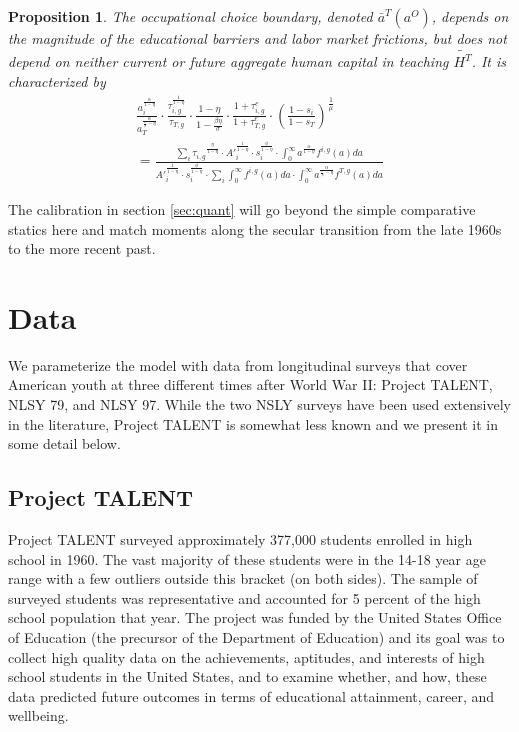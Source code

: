 \documentclass[onehalfspacing,11pt]{article}
\newtheorem{prp}{Proposition}
\begin{document}
\begin{prp} The occupational choice boundary, denoted $\bar{a}^T(a^O)$, depends on the magnitude of the educational barriers and labor market frictions, but does not depend on neither current or future aggregate human capital in teaching $\widetilde{H^T}$. It is characterized by
\begin{align}
\label{eq:occChoice}
\frac{a_i^{\frac{\alpha}{1-\eta}}}{a_T^{\frac{\alpha}{\frac{\sigma}{\beta}-\eta}}} \cdot \frac{\tau_{i,g}^\frac{1}{1-\eta}}{\tau_{T,g}} \cdot \frac{1-\eta}{1-\tfrac{\beta \eta}{\sigma}} \cdot \frac{1+\tau^e_{i,g}}{1+\tau^e_{T,g}} \cdot \left(\frac{1-s_i}{1-s_T}\right)^\frac{1}{\mu} \nonumber\\
= \frac{\sum_i {\tau_{i,g}}^{\frac{\eta}{1-\eta}} \cdot {A'}_i^{\frac{1}{1-\eta}} \cdot s_i^{\frac{\phi}{1-\eta}} \cdot \int_0^\infty a^{\frac{\alpha}{1-\eta}} f^{i,g}(a)da }{{A'}_i^\frac{1}{1-\eta} \cdot s_i^\frac{\phi}{1-\eta} \cdot \sum_i \int_0^\infty f^{i,g}(a)da \cdot \int_0^\infty a^{\frac{\alpha}{\frac{\sigma}{\beta}-\eta}} f^{T,g}(a)da } 
\end{align}
\end{prp}

The calibration in section \ref{sec:quant} will go beyond the simple comparative statics here and match moments along the secular transition from the late 1960s to the more recent past.


\section{Data}\label{sec:data}

We parameterize the model with data from longitudinal surveys that cover American youth at three different times after World War II: Project TALENT, NLSY 79, and NLSY 97. While the two NSLY surveys have been used extensively in the literature, Project TALENT is somewhat less known and we present it in some detail below.
\subsection{Project TALENT}

Project TALENT surveyed approximately 377,000 students enrolled in high school in 1960. The vast majority of these students were in the 14-18 year age range with a few outliers outside this bracket (on both sides). The sample of surveyed students was representative and accounted for 5 percent of the high school population that year. The project was funded by the United States Office of Education (the precursor of the Department of Education) and its goal was to collect high quality data on the achievements, aptitudes, and interests of high school students in the United States, and to examine whether, and how, these data predicted future outcomes in terms of educational attainment, career, and wellbeing.
\end{document}
